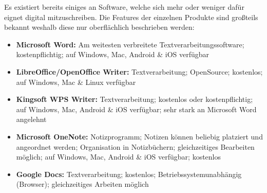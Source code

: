 
Es existiert bereits einiges an Software, welche sich mehr oder weniger dafür eignet digital mitzuschreiben. Die Features der einzelnen Produkte sind großteils bekannt weshalb diese nur oberflächlich beschrieben werden:

\begin{itemize}
\item \textbf{Microsoft Word:} Am weitesten verbreitete Textverarbeitungssoftware; kostenpflichtig; auf Windows, Mac, Android \& iOS verfügbar
\item \textbf{LibreOffice/OpenOffice Writer:} Textverarbeitung; OpenSource; kostenlos; auf Windows, Mac \& Linux verfügbar
\item \textbf{Kingsoft WPS Writer:} Textverarbeitung; kostenlos oder kostenpflichtig; auf Windows, Mac, Android \& iOS verfügbar; sehr stark an Microsoft Word angelehnt
\item \textbf{Microsoft OneNote:} Notizprogramm; Notizen können beliebig platziert und angeordnet werden; Organisation in Notizbüchern; gleichzeitiges Bearbeiten möglich; auf Windows, Mac, Android \& iOS verfügbar; kostenlos
\item \textbf{Google Docs:} Textverarbeitung; kostenlos; Betriebssystemunabhängig (Browser); gleichzeitiges Arbeiten möglich
\end{itemize}